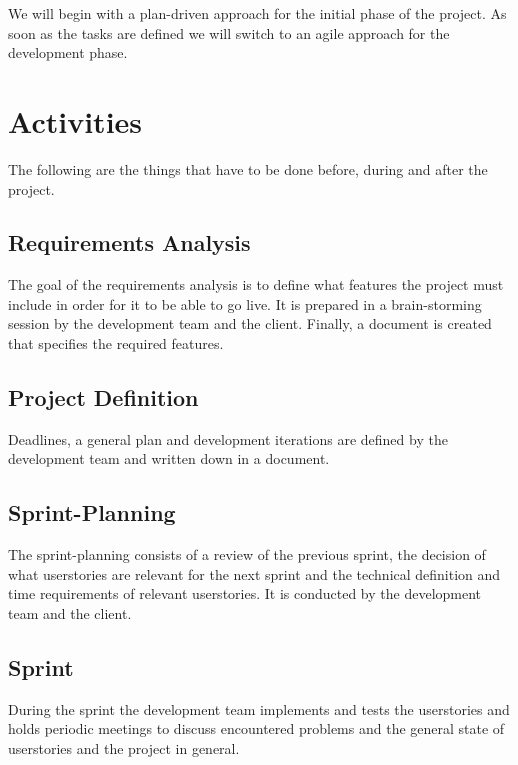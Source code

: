 \documentclass[a4paper]{scrartcl}
\begin{document}
We will begin with a plan-driven approach for the initial phase of the project. As soon as the tasks are defined we will switch to an agile approach for the development phase.

\section{Activities}
The following are the things that have to be done before, during and after the project.

\subsection{Requirements Analysis}
The goal of the requirements analysis is to define what features the project must include in order for it to be able to go live. It is prepared in a brain-storming session by the development team and the client. Finally, a document is created that specifies the required features.

\subsection{Project Definition}
Deadlines, a general plan and development iterations are defined by the development team and written down in a document.

\subsection{Sprint-Planning}
The sprint-planning consists of a review of the previous sprint, the decision of what userstories are relevant for the next sprint  and the technical definition and time requirements of relevant userstories. It is conducted by the development team and the client.

\subsection{Sprint}
During the sprint the development team implements and tests the userstories and holds periodic meetings to discuss encountered problems and the general state of userstories and the project in general.
\end{document}
